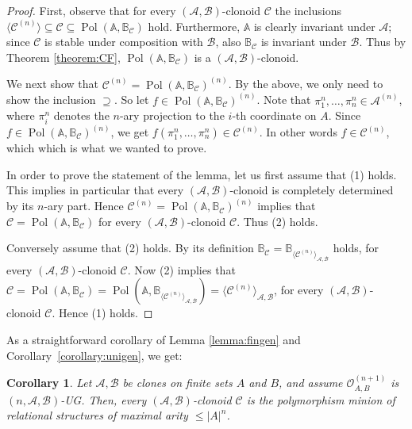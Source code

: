 \documentclass[11pt]{amsart}
\theoremstyle{plain}
\newtheorem{corollary}[thm]{Corollary}
\theoremstyle{definition}
\DeclareMathOperator{\Pol}{Pol}
\newcommand{\clone}[1]{\mathcal{#1}}
\newcommand{\clonoid}[1]{\mathcal{#1}}
\newcommand{\clodC}{\clonoid{C}}
\newcommand{\clodO}{\clonoid{O}}
\newcommand{\cloA}{\clone{A}}
\newcommand{\cloB}{\clone{B}}
\newcommand{\cloC}{\clone{C}}
\begin{document}
\begin{proof}
First, observe that for every $(\cloA,\cloB)$-clonoid $\clodC$ the inclusions $\langle \clodC^{(n)} \rangle \subseteq \clodC \subseteq \Pol(\mathbb A,\mathbb B_{\cloC})$ hold. Furthermore, $\mathbb A$ is clearly invariant under $\cloA$; since $\cloC$ is stable under composition with $\cloB$, also $\mathbb B_{\cloC}$ is invariant under $\cloB$. Thus by Theorem \ref{theorem:CF}, $\Pol(\mathbb A,\mathbb B_{\cloC})$ is a $(\cloA, \cloB)$-clonoid.

We next show that $\clodC^{(n)} = \Pol(\mathbb A,\mathbb B_{\cloC})^{(n)}$. By the above, we only need to show the inclusion $\supseteq$. So let $f \in \Pol(\mathbb A,\mathbb B_{\cloC})^{(n)}$. Note that $\pi_1^n,\ldots,\pi_n^n \in \cloA^{(n)}$, where $\pi_i^n$ denotes the $n$-ary projection to the $i$-th coordinate on $A$. Since $f \in \Pol(\mathbb A,\mathbb B_{\cloC})^{(n)}$, we get $ f(\pi_1^n,\ldots,\pi_n^n) \in \clodC^{(n)}$. In other words $f \in \clodC^{(n)}$, which 
which is what we wanted to prove.

In order to prove the statement of the lemma, let us first assume that (1) holds. This implies in particular that every $(\cloA,\cloB)$-clonoid is completely determined by its $n$-ary part. Hence $\cloC^{(n)} = \Pol(\mathbb A,\mathbb B_{\cloC})^{(n)}$ implies that $\cloC = \Pol(\mathbb A,\mathbb B_{\cloC})$ for every $(\cloA,\cloB)$-clonoid $\clodC$. Thus (2) holds.

Conversely assume that (2) holds. By its definition $\mathbb B_{\cloC} = \mathbb B_{\langle \cloC^{(n)} \rangle_{\cloA,\cloB}}$ holds, for every $(\cloA,\cloB)$-clonoid $\cloC$. Now (2) implies that $\clodC = \Pol(\mathbb A,\mathbb B_{\cloC}) = \Pol(\mathbb A,\mathbb B_{\langle \cloC^{(n)} \rangle_{\cloA,\cloB}}) = \langle \cloC^{(n)} \rangle_{\cloA,\cloB}$, for every $(\cloA,\cloB)$-clonoid $\cloC$. Hence (1) holds.
\end{proof}

As a straightforward corollary of Lemma \ref{lemma:fingen} and Corollary~\ref{corollary:unigen}, we get:

\begin{corollary} \label{corollary:fingen}
Let $\cloA, \cloB$ be clones on finite sets $A$ and $B$, and assume $\clodO_{A,B}^{(n+1)}$ is $(n,\cloA, \cloB)$-UG. Then, every $(\cloA, \cloB)$-clonoid $\clodC$ is the polymorphism minion of relational structures of maximal arity $\leq |A|^n$.
\end{corollary}
\end{document}
